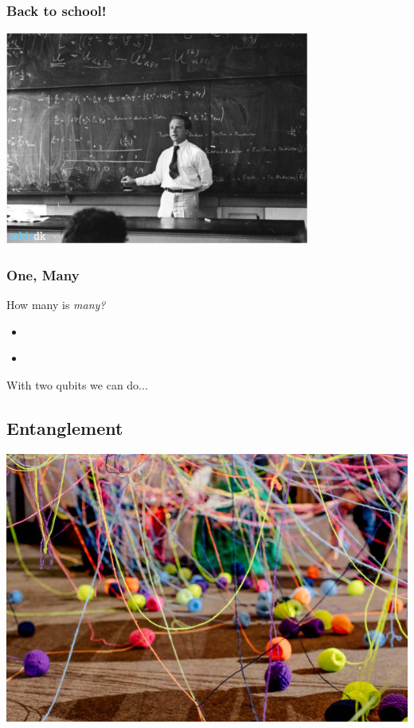 \documentclass[10pt]{beamer}
\begin{document}
\begin{frame}
  \frametitle{Back to school!}
  \centering
  \includegraphics[width=10cm]{img/back-to-school.png}
\end{frame}
\begin{frame}
  \frametitle{One, Many}
  How many is \emph{many?}
  \begin{itemize}
  \item<2->   
  \end{itemize}
  \begin{itemize}
  \item<7->  
  \end{itemize}
   {With two qubits we can do...}
\end{frame}

\begin{frame}
  \section{Entanglement}
  \centering
  \includegraphics[width=0.7\linewidth]{img/tangled-yarn.jpg}
\end{frame}
\end{document}
